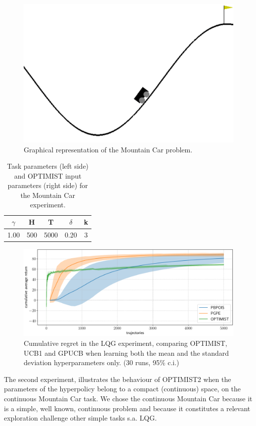 \begin{figure}[t!] 
\centering
\includegraphics[width=.6\textwidth,keepaspectratio]{Images/MC.png}
\caption{Graphical representation of the Mountain Car problem.} 
\label{fig:MC}
\end{figure} 

\begin{table}[t!]
\centering
\begin{tabular}{ccc|cc} 
\toprule
$\gamma$ & H & T & $\delta$ & k\\ 
\midrule
1.00 & 500 & 5000 & 0.20 & 3\\
\bottomrule
\end{tabular}
\caption{Task parameters (left side) and \gls{OPTIMIST} input parameters (right side) for the Mountain Car experiment.}
\label{tab:MCcoeff}
\end{table}

\begin{figure}[t!] 
\centering
\includegraphics[width=\textwidth,height=\textheight,keepaspectratio]{Images/MC_mu.pdf}
\caption{Cumulative regret in
the \gls{LQG} experiment, comparing
\gls{OPTIMIST}, \gls{UCB}1 and \gls{GPUCB} when learning both the mean and the standard deviation hyperparameters only.
(30 runs, 95\% c.i.)} 
\label{fig:MCcomparison} 
\end{figure}

The second experiment, illustrates the behaviour of \gls{OPTIMIST}2  
when the parameters of the hyperpolicy belong to a compact (continuous) space, on the continuous Mountain Car task\cite{brockman2016openai}. We chose the continuous Mountain Car because it is a simple, well known, continuous problem and because it constitutes a relevant exploration challenge \wrt other simple tasks s.a. \gls{LQG}. 

